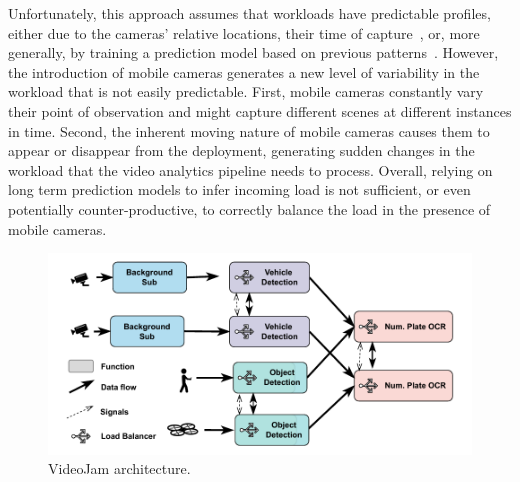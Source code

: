 Unfortunately, this approach assumes that workloads have predictable profiles, either due to the cameras' relative locations, their time of capture~\cite{jiang2018chameleon}, or, more generally, by training a prediction model based on previous patterns~\cite{zeng2020distream}. However, the introduction of mobile cameras generates a new level of variability in the workload that is not easily predictable. First, mobile cameras constantly vary their point of observation and might capture different scenes at different instances in time. Second, the inherent moving nature of mobile cameras causes them to appear or disappear from the deployment, generating sudden changes in the workload that the video analytics pipeline needs to process. Overall, relying on long term prediction models to infer incoming load is not sufficient, or even potentially counter-productive, to correctly balance the load in the presence of mobile cameras.

\begin{figure}
    \centering
    \includegraphics[width=\linewidth]{chapters/videojam/images/architecture.pdf}
    \caption{VideoJam architecture.}
    \label{fig:architecture}
\end{figure}


